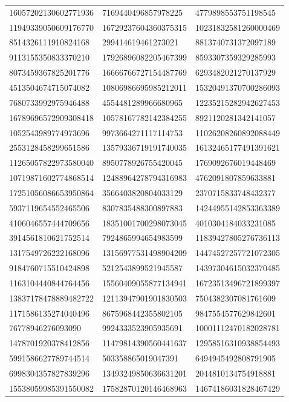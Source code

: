\begin{longtable}{*{3}{l}}
16057202130602771936&7169440496857978225&4779898553751198545\\
11949339050609176770&16729237604360375315&10231832581260000469\\
8514326111910824168&299414619461273021&8813740731372097189\\
9113155350833370210&17926896082205467399&8593307359329285993\\
8073459367825201776&16666766727154487769&6293482021270137929\\
4513504674715074082&10806986695985212011&15320491370700286093\\
7680733992975946488&4554481289966680965&12235215282942627453\\
16789696572909308418&10578167782142384255&8921120281342141057\\
1052543989774973696&9973664271117114753&11026208260892088449\\
2553128458299651586&13579336719191740035&16132465177491391621\\
11265057822973580040&8950778926755420045&1769092676019448469\\
10719871602774868514&12488964278794316983&4762091807859633881\\
17251056086653950864&3566403820804033129&2370715833748432377\\
5937119654552465506&8307835488300897883&14244955142853363389\\
4106046557444709656&18351001700298073045&4010304184033231085\\
3914561810621752514&7924865994654983599&11839427805276736113\\
1317549726222168096&13156977531498904209&14474527257721072305\\
9184760715510424898&5212543899521945587&14397304615032370485\\
1163104440844764456&15560409055877134941&16723513496721899397\\
13837178478889482722&12113947901901830503&7504382307081761609\\
1171586135274040496&8675968442355802105&9847554577629842601\\
76778946276093090&9924333523905935691&10001112470182028781\\
1478701920378412856&11479814390560441637&12958516310938854493\\
5991586627789744514&503358865019047391&6494945492808791905\\
6998304357827839296&13493249850636631201&2044810134754918881\\
15538059985391550082&17582870120146468963&14674186031828467429\\

\end{longtable}
